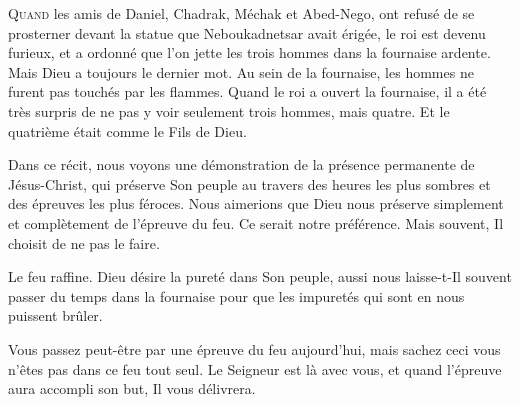 \dvrule







\lettrine{Q}{uand} les amis de Daniel, Chadrak, Méchak et Abed-Nego,
 ont refusé de se prosterner devant la statue que Neboukadnetsar avait érigée,
 le roi est devenu furieux, et a ordonné que l'on jette les trois hommes
 dans la fournaise ardente. Mais Dieu a toujours le dernier mot.
 Au sein de la fournaise, les hommes ne furent pas touchés par les flammes.
 Quand le roi a ouvert la fournaise, il a été très surpris de ne pas y voir
 seulement trois hommes, mais quatre.
 Et le quatrième était comme \Og le Fils de Dieu. \Fg{}

Dans ce récit, nous voyons une démonstration de la présence permanente
 de Jésus-Christ, qui préserve Son peuple au travers des heures
 les plus sombres et des  épreuves les plus féroces.
 Nous aimerions que Dieu nous préserve simplement et complètement
 de l'épreuve du feu. Ce serait notre préférence.
 Mais souvent, Il choisit de ne pas le faire. 


Le feu raffine. Dieu désire la pureté dans Son peuple,
 aussi nous laisse-t-Il souvent passer du temps dans la fournaise
 pour que les impuretés qui sont en nous puissent brûler. 

Vous passez peut-être par une épreuve du feu aujourd'hui, mais sachez ceci
 \ocadr vous n'êtes pas dans ce feu tout seul.
 Le Seigneur est là avec vous, et quand l'épreuve aura accompli son but,
 Il vous délivrera. 

